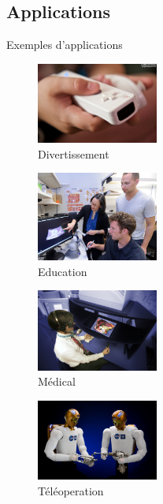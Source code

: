 \documentclass[compress, noflama]{beamer}
\begin{document}
\subsection{Applications}
\begin{frame}{Exemples d'applications}
\begin{multicols}{2}
\begin{figure}
	\centering			
	\includegraphics[width=4cm]{images/wiimote}%
	\caption{Divertissement}
	\end{figure}
		\vspace{-0.7cm}	
	\begin{figure}	
	\includegraphics[width=4cm]{images/education}%
	\caption{Education}
	\end{figure}

\begin{figure}
	\centering			
	\includegraphics[width=4cm]{images/hapticSurgery}%
	\caption{Médical}
		\end{figure}	
					\vspace{-1.5cm}	
	\begin{figure}
	\includegraphics[width=4cm]{images/teleoperation}%
	\caption{Téléoperation}
	\end{figure}
	
\end{multicols}
\end{frame}
\end{document}
